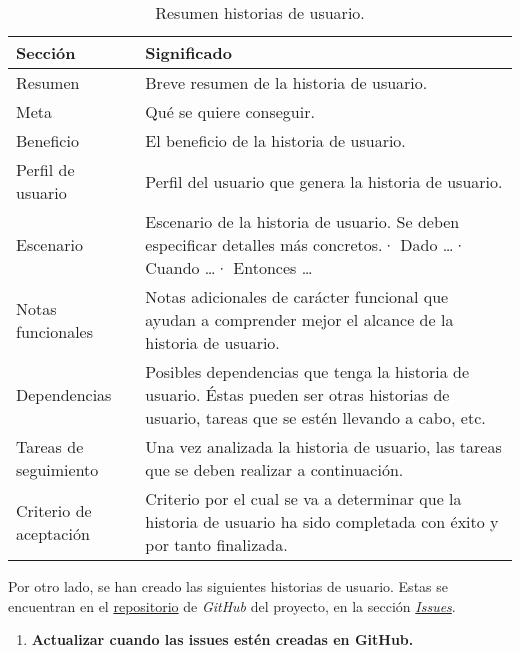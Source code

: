 \begin{table}[H]
    \centering
    \def\arraystretch{1.25}
    \begin{adjustbox}{max width=\textwidth}
    \begin{tabularx}{\textwidth}{|l|L|}
    \hline
        \textbf{Sección} & \textbf{Significado} \\ \hline
    \hline
        Resumen & Breve resumen de la historia de usuario. \\ \hline
        Meta & Qué se quiere conseguir. \\ \hline
        Beneficio & El beneficio de la historia de usuario. \\ \hline
        Perfil de usuario & Perfil del usuario que genera la historia de usuario. \\ \hline
        Escenario & Escenario de la historia de usuario. Se deben especificar detalles más concretos.\linebreak · Dado …\linebreak · Cuando …\linebreak · Entonces … \\ \hline
        Notas funcionales & Notas adicionales de carácter funcional que ayudan a comprender mejor el alcance de la historia de usuario. \\ \hline
        Dependencias & Posibles dependencias que tenga la historia de usuario. Éstas pueden ser otras historias de usuario, tareas que se estén llevando a cabo, etc. \\ \hline
        Tareas de seguimiento & Una vez analizada la historia de usuario, las tareas que se deben realizar a continuación. \\ \hline
        Criterio de aceptación & Criterio por el cual se va a determinar que la historia de usuario ha sido completada con éxito y por tanto finalizada. \\ \hline
    \end{tabularx}
    \end{adjustbox}
    \caption{Resumen historias de usuario.}
\end{table}

\bigskip

Por otro lado, se han creado las siguientes historias de usuario. Estas se encuentran en el \href{https://github.com/harvestcore/matroos}{repositorio} de \textit{GitHub} del proyecto, en la sección \href{https://github.com/harvestcore/matroos/labels/US}{\textit{Issues}}.

\begin{enumerate}
	\item \textbf{Actualizar cuando las issues estén creadas en GitHub.}
\end{enumerate}


